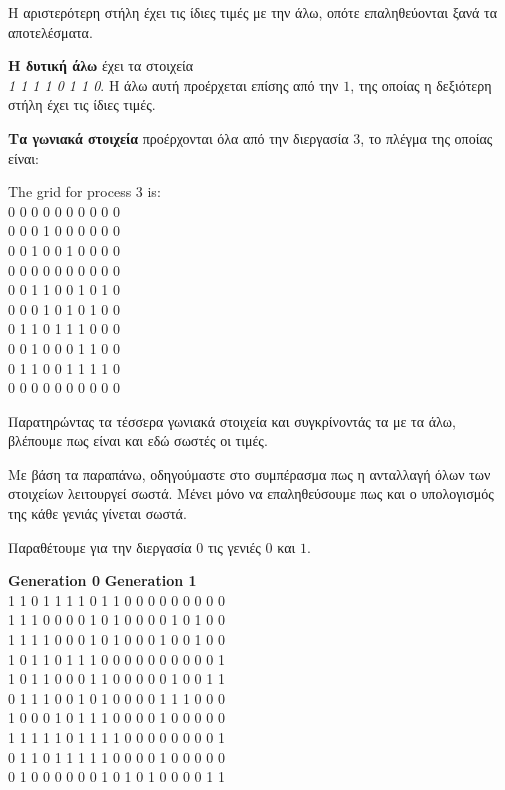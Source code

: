 \begin{multicols}{2}
Η αριστερότερη στήλη έχει τις ίδιες τιμές με την άλω, οπότε επαληθεύονται ξανά τα αποτελέσματα. \par

\textbf{Η δυτική άλω} έχει τα στοιχεία \\ \emph{1 1 1 1 0 1 1 0}. Η άλω αυτή προέρχεται επίσης από την $1$, της οποίας η δεξιότερη στήλη έχει τις ίδιες τιμές. \par
\textbf{Τα γωνιακά στοιχεία} προέρχονται όλα από την διεργασία $3$, το πλέγμα της οποίας είναι:

\begin{tcolorbox}
The grid for process 3 is: \\
0 0 0 0 0 0 0 0 0 0 \\
0 0 0 1 0 0 0 0 0 0 \\
0 0 1 0 0 1 0 0 0 0 \\
0 0 0 0 0 0 0 0 0 0 \\
0 0 1 1 0 0 1 0 1 0 \\
0 0 0 1 0 1 0 1 0 0 \\
0 1 1 0 1 1 1 0 0 0 \\
0 0 1 0 0 0 1 1 0 0 \\
0 1 1 0 0 1 1 1 1 0 \\
0 0 0 0 0 0 0 0 0 0 \\
\end{tcolorbox}
Παρατηρώντας τα τέσσερα γωνιακά στοιχεία και συγκρίνοντάς τα με τα άλω, βλέπουμε πως είναι και εδώ σωστές οι τιμές. \par
Με βάση τα παραπάνω, οδηγούμαστε στο συμπέρασμα πως η ανταλλαγή όλων των στοιχείων λειτουργεί σωστά. Μένει μόνο να επαληθεύσουμε πως και ο υπολογισμός της κάθε γενιάς γίνεται σωστά. \par
Παραθέτουμε για την διεργασία $0$ τις γενιές $0$ και $1$. \\

\begin{tcolorbox}[left=2pt,right=2pt]
\centering
\textbf{Generation 0} \quad \textbf{Generation 1} \\
1 1 0 1 1 1 1 0 1 1  0 0 0 0 0 0 0 0 0 \\
1 1 1 0 0 0 0 1 0 1  0 0 0 0 1 0 1 0 0 \\
1 1 1 1 0 0 0 1 0 1  0 0 0 1 0 0 1 0 0 \\
1 0 1 1 0 1 1 1 0 0  0 0 0 0 0 0 0 0 1 \\
1 0 1 1 0 0 0 1 1 0  0 0 0 0 1 0 0 1 1 \\
0 1 1 1 0 0 1 0 1 0  0 0 0 1 1 1 0 0 0 \\
1 0 0 0 1 0 1 1 1 0  0 0 0 1 0 0 0 0 0 \\
1 1 1 1 1 0 1 1 1 1  0 0 0 0 0 0 0 0 1 \\
0 1 1 0 1 1 1 1 1 0  0 0 0 1 0 0 0 0 0 \\
0 1 0 0 0 0 0 0 1 0  1 0 1 0 0 0 0 1 1 \\
\end{tcolorbox}


\end{multicols}
